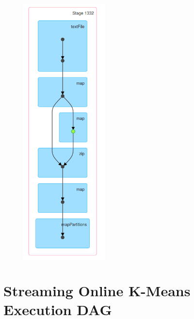 \documentclass{l4proj}
\begin{document}
\begin{appendices}
\begin{figure}[H]
	\centering
    \includegraphics[width=0.40\textwidth]{images/DAG5}
    \label{fig:dag5}
\end{figure}

\section{Streaming Online K-Means Execution DAG}


\end{appendices}
\end{document}
